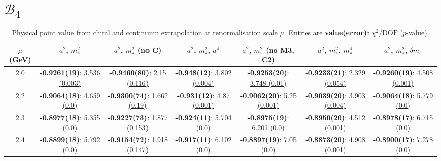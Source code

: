 \documentclass[12pt]{extarticle}
\begin{document}
\section{$\mathcal{B}_4$}
\begin{table}[h!]
\begin{center}
\begin{tabular}{|c|c|c|c|c|c|c|}
\hline
$\mu$ (GeV) & $a^2$, $m_\pi^2$& $a^2$, $m_\pi^2$ (no C)& $a^2$, $m_\pi^2$, $a^4$& $a^2$, $m_\pi^2$ (no M3, C2)& $a^2$, $m_\pi^2$, $m_\pi^4$& $a^2$, $m_\pi^2$, $\delta m_s$\\
\hline
2.0& \hyperlink{SSpPP/NPR/bag_a2m2_20.pdf.1}{\textbf{-0.9261(19)}: 3.536 (0.003)} & \hyperlink{SSpPP/NPR/bag_a2m2noC_20.pdf.1}{\textbf{-0.9460(80)}: 2.15 (0.116)} & \hyperlink{SSpPP/NPR/bag_a2a4m2_20.pdf.1}{\textbf{-0.948(12)}: 3.802 (0.004)} & \hyperlink{SSpPP/NPR/bag_a2m2mcut_20.pdf.1}{\textbf{-0.9253(20)}: 3.748 (0.01)} & \hyperlink{SSpPP/NPR/bag_a2m2m4_20.pdf.1}{\textbf{-0.9233(21)}: 2.329 (0.054)} & \hyperlink{SSpPP/NPR/bag_a2m2delm_20.pdf.1}{\textbf{-0.9260(19)}: 4.508 (0.001)}\\
2.2& \hyperlink{SSpPP/NPR/bag_a2m2_22.pdf.1}{\textbf{-0.9064(18)}: 4.659 (0.0)} & \hyperlink{SSpPP/NPR/bag_a2m2noC_22.pdf.1}{\textbf{-0.9300(74)}: 1.662 (0.19)} & \hyperlink{SSpPP/NPR/bag_a2a4m2_22.pdf.1}{\textbf{-0.931(12)}: 4.87 (0.001)} & \hyperlink{SSpPP/NPR/bag_a2m2mcut_22.pdf.1}{\textbf{-0.9062(20)}: 5.25 (0.001)} & \hyperlink{SSpPP/NPR/bag_a2m2m4_22.pdf.1}{\textbf{-0.9039(20)}: 3.903 (0.004)} & \hyperlink{SSpPP/NPR/bag_a2m2delm_22.pdf.1}{\textbf{-0.9064(18)}: 5.779 (0.0)}\\
2.3& \hyperlink{SSpPP/NPR/bag_a2m2_23.pdf.1}{\textbf{-0.8977(18)}: 5.355 (0.0)} & \hyperlink{SSpPP/NPR/bag_a2m2noC_23.pdf.1}{\textbf{-0.9227(73)}: 1.877 (0.153)} & \hyperlink{SSpPP/NPR/bag_a2a4m2_23.pdf.1}{\textbf{-0.924(11)}: 5.704 (0.0)} & \hyperlink{SSpPP/NPR/bag_a2m2mcut_23.pdf.1}{\textbf{-0.8975(19)}: 6.201 (0.0)} & \hyperlink{SSpPP/NPR/bag_a2m2m4_23.pdf.1}{\textbf{-0.8950(20)}: 4.512 (0.001)} & \hyperlink{SSpPP/NPR/bag_a2m2delm_23.pdf.1}{\textbf{-0.8978(17)}: 6.715 (0.0)}\\
2.4& \hyperlink{SSpPP/NPR/bag_a2m2_24.pdf.1}{\textbf{-0.8899(18)}: 5.792 (0.0)} & \hyperlink{SSpPP/NPR/bag_a2m2noC_24.pdf.1}{\textbf{-0.9154(72)}: 1.918 (0.147)} & \hyperlink{SSpPP/NPR/bag_a2a4m2_24.pdf.1}{\textbf{-0.917(11)}: 6.102 (0.0)} & \hyperlink{SSpPP/NPR/bag_a2m2mcut_24.pdf.1}{\textbf{-0.8897(19)}: 7.05 (0.0)} & \hyperlink{SSpPP/NPR/bag_a2m2m4_24.pdf.1}{\textbf{-0.8873(20)}: 4.908 (0.001)} & \hyperlink{SSpPP/NPR/bag_a2m2delm_24.pdf.1}{\textbf{-0.8900(17)}: 7.278 (0.0)}\\
\hline
\end{tabular}
\caption{Physical point value from chiral and continuum extrapolation at renormalisation scale $\mu$. Entries are \textbf{value(error)}: $\chi^2/\text{DOF}$ ($p$-value).}
\end{center}
\end{table}
\end{document}
